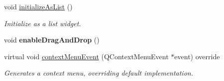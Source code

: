 \begin{Indent}
\begin{DoxyCompactItemize}
\mbox{\label{classrev_1_1_view_1_1_tree_widget_ac026fb6215cc6f45b54a979c3c0709e2}} 
void \mbox{\hyperlink{classrev_1_1_view_1_1_tree_widget_ac026fb6215cc6f45b54a979c3c0709e2}{initialize\+As\+List}} ()
\begin{DoxyCompactList}\small\item\em Initialize as a list widget. \end{DoxyCompactList}\item 
\mbox{\label{classrev_1_1_view_1_1_tree_widget_ad0a6642a37b709ed3026db4909ba4dd9}} 
void {\bfseries enable\+Drag\+And\+Drop} ()
\item 
virtual void \mbox{\hyperlink{classrev_1_1_view_1_1_tree_widget_a47fe709b7b08a5d327a66d091e64820b}{context\+Menu\+Event}} (Q\+Context\+Menu\+Event $\ast$event) override
\begin{DoxyCompactList}\small\item\em Generates a context menu, overriding default implementation. \end{DoxyCompactList}\end{DoxyCompactItemize}
\end{Indent}
